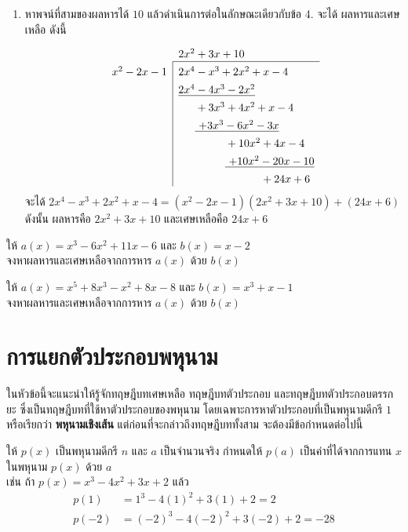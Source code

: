 \begin{conceptbox}
\begin{enumerate}
		\item หาพจน์ที่สามของผลหารได้ $10$ แล้วดำเนินการต่อในลักษณะเดียวกับข้อ 4. จะได้ ผลหารและเศษเหลือ ดังนี้
		\[
		\setlength{\extrarowheight}{1.0ex} %
		\begin{array}{r|l}
			\multicolumn{1}{c}{} & 2x^2 + 3x + 10 \\ \cline{2-2}
			x^2 - 2x - 1 & 2x^4 - x^3 + 2x^2 + x - 4 \\
			& \underline{2x^4 - 4x^3 - 2x^2} \\
			& \phantom{2x^4} + 3x^3 + 4x^2 + x - 4 \\
			& \phantom{2x^4} \underline{\ + 3x^3 - 6x^2 - 3x} \\
			& \phantom{2x^4 + 3x^3} + 10x^2 + 4x - 4 \\
			& \phantom{2x^4 + 3x^3} \underline{\ + 10x^2 - 20x - 10} \\
			& \phantom{2x^4 + 3x^3 + 10x^2} + 24x + 6
		\end{array}
		\]
		\vspace{0.5em}
		จะได้ $2x^4 - x^3 + 2x^2 + x - 4 = (x^2 - 2x - 1)(2x^2 + 3x + 10) + (24x + 6)$
		\newline
		ดังนั้น ผลหารคือ $2x^2 + 3x + 10$ และเศษเหลือคือ $24x + 6$
	\end{enumerate}
\end{conceptbox}
\newpage
\begin{examplebox}
	ให้ $a(x) = x^{3}-6x^{2}+11x-6$ และ $b(x) = x-2$ \\
	จงหาผลหารและเศษเหลือจากการหาร $a(x)$ ด้วย $b(x)$
\end{examplebox}
\solution
\newpage

\begin{examplebox}
	ให้ $a(x) = x^{5}+8x^{3}-x^{2}+8x-8$ และ $b(x) = x^{3}+x-1$ \\
	จงหาผลหารและเศษเหลือจากการหาร $a(x)$ ด้วย $b(x)$
\end{examplebox}
\solution

\newpage
\section{การแยกตัวประกอบพหุนาม}

ในหัวข้อนี้จะแนะนำให้รู้จักทฤษฎีบทเศษเหลือ ทฤษฎีบทตัวประกอบ และทฤษฎีบทตัวประกอบตรรกยะ ซึ่งเป็นทฤษฎีบทที่ใช้หาตัวประกอบของพหุนาม โดยเฉพาะการหาตัวประกอบที่เป็นพหุนามดีกรี $1$ หรือเรียกว่า \textbf{พหุนามเชิงเส้น} แต่ก่อนที่จะกล่าวถึงทฤษฎีบททั้งสาม จะต้องมีข้อกำหนดต่อไปนี้
\\[0.5em]
\begin{remarkbox}
	ให้ $p(x)$ เป็นพหุนามดีกรี $n$ และ $a$ เป็นจำนวนจริง กำหนดให้ $p(a)$ เป็นค่าที่ได้จากการแทน $x$ ในพหุนาม $p(x)$ ด้วย $a$
	\\[0.5em]
	เช่น ถ้า $p(x) = x^3 - 4x^2 + 3x + 2$ แล้ว
	\begin{align*}
		p(1) &= 1^3 - 4(1)^2 + 3(1) + 2 = 2 \\
		p(-2) &= (-2)^3 - 4(-2)^2 + 3(-2) + 2 = -28
	\end{align*}
\end{remarkbox}

